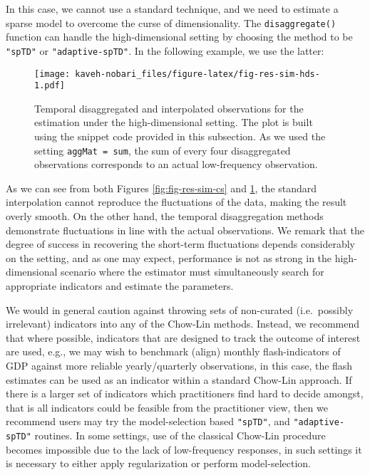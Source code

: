 In this case, we cannot use a standard technique, and we need to estimate a sparse model to overcome the curse of dimensionality. The \texttt{disaggregate()} function can handle the high-dimensional setting by choosing the method to be \texttt{"spTD"} or \texttt{"adaptive-spTD"}. In the following example, we use the latter:

\begin{figure}
\centering
\texttt{[image: kaveh-nobari\_files/figure-latex/fig-res-sim-hds-1.pdf]}
\caption{\label{fig:fig-res-sim-hds}Temporal disaggregated and interpolated observations for the estimation under the high-dimensional setting. The plot is built using the snippet code provided in this subsection. As we used the setting \texttt{aggMat\ =\ sum}, the sum of every four disaggregated observations corresponds to an actual low-frequency observation.}
\end{figure}

As we can see from both Figures \ref{fig:fig-res-sim-cs} and \ref{fig:fig-res-sim-hds}, the standard interpolation cannot reproduce the fluctuations of the data, making the result overly smooth. On the other hand, the temporal disaggregation methods demonstrate fluctuations in line with the actual observations. We remark that the degree of success in recovering the short-term fluctuations depends considerably on the setting, and as one may expect, performance is not as strong in the high-dimensional scenario where the estimator must simultaneously search for appropriate indicators and estimate the parameters.

We would in general caution against throwing sets of non-curated (i.e.~possibly irrelevant) indicators into any of the Chow-Lin methods. Instead, we recommend that where possible, indicators that are designed to track the outcome of interest are used, e.g., we may wish to benchmark (align) monthly flash-indicators of GDP against more reliable yearly/quarterly observations, in this case, the flash estimates can be used as an indicator within a standard Chow-Lin approach. If there is a larger set of indicators which practitioners find hard to decide amongst, that is all indicators could be feasible from the practitioner view, then we recommend users may try the model-selection based \texttt{"spTD"}, and \texttt{"adaptive-spTD"} routines. In some settings, use of the classical Chow-Lin procedure becomes impossible due to the lack of low-frequency responses, in such settings it is necessary to either apply regularization or perform model-selection.

